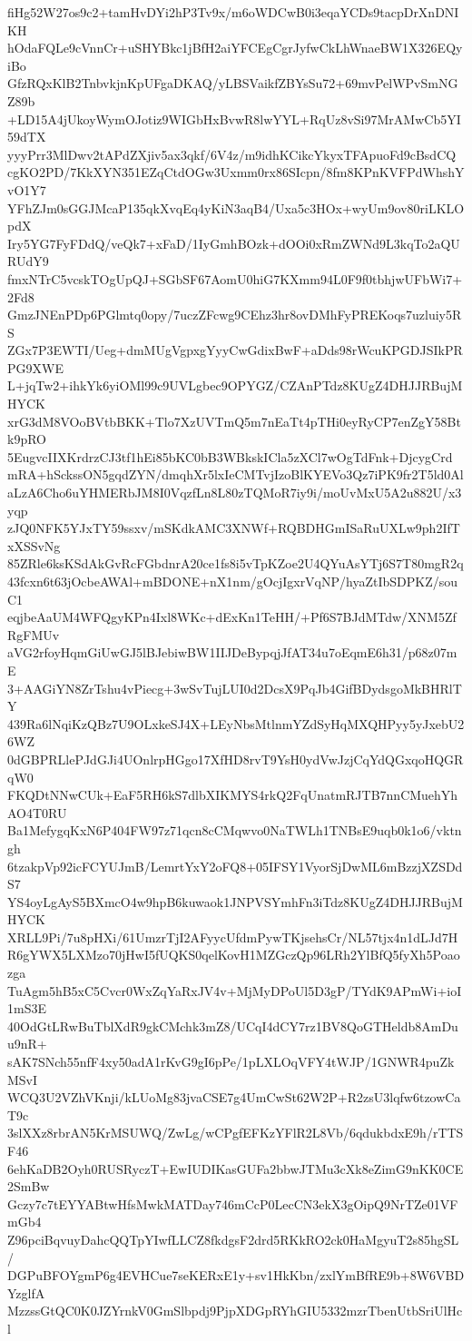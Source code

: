 fiHg52W27os9c2+tamHvDYi2hP3Tv9x/m6oWDCwB0i3eqaYCDs9tacpDrXnDNIKH
hOdaFQLe9cVnnCr+uSHYBkc1jBfH2aiYFCEgCgrJyfwCkLhWnaeBW1X326EQyiBo
GfzRQxKlB2TnbvkjnKpUFgaDKAQ/yLBSVaikfZBYsSu72+69mvPelWPvSmNGZ89b
+LD15A4jUkoyWymOJotiz9WIGbHxBvwR8lwYYL+RqUz8vSi97MrAMwCb5YI59dTX
yyyPrr3MlDwv2tAPdZXjiv5ax3qkf/6V4z/m9idhKCikcYkyxTFApuoFd9cBsdCQ
cgKO2PD/7KkXYN351EZqCtdOGw3Uxmm0rx86SIcpn/8fm8KPnKVFPdWhshYvO1Y7
YFhZJm0sGGJMcaP135qkXvqEq4yKiN3aqB4/Uxa5c3HOx+wyUm9ov80riLKLOpdX
Iry5YG7FyFDdQ/veQk7+xFaD/1IyGmhBOzk+dOOi0xRmZWNd9L3kqTo2aQURUdY9
fmxNTrC5vcskTOgUpQJ+SGbSF67AomU0hiG7KXmm94L0F9f0tbhjwUFbWi7+2Fd8
GmzJNEnPDp6PGlmtq0opy/7uczZFcwg9CEhz3hr8ovDMhFyPREKoqs7uzluiy5RS
ZGx7P3EWTI/Ueg+dmMUgVgpxgYyyCwGdixBwF+aDds98rWcuKPGDJSIkPRPG9XWE
L+jqTw2+ihkYk6yiOMl99c9UVLgbec9OPYGZ/CZAnPTdz8KUgZ4DHJJRBujMHYCK
xrG3dM8VOoBVtbBKK+Tlo7XzUVTmQ5m7nEaTt4pTHi0eyRyCP7enZgY58Btk9pRO
5EugvcIIXKrdrzCJ3tf1hEi85bKC0bB3WBkskICla5zXCl7wOgTdFnk+DjcygCrd
mRA+hSckssON5gqdZYN/dmqhXr5lxIeCMTvjIzoBlKYEVo3Qz7iPK9fr2T5ld0Al
aLzA6Cho6uYHMERbJM8I0VqzfLn8L80zTQMoR7iy9i/moUvMxU5A2u882U/x3yqp
zJQ0NFK5YJxTY59ssxv/mSKdkAMC3XNWf+RQBDHGmISaRuUXLw9ph2IfTxXSSvNg
85ZRle6ksKSdAkGvRcFGbdnrA20ce1fs8i5vTpKZoe2U4QYuAsYTj6S7T80mgR2q
43fcxn6t63jOcbeAWAl+mBDONE+nX1nm/gOcjIgxrVqNP/hyaZtIbSDPKZ/souC1
eqjbeAaUM4WFQgyKPn4Ixl8WKc+dExKn1TeHH/+Pf6S7BJdMTdw/XNM5ZfRgFMUv
aVG2rfoyHqmGiUwGJ5lBJebiwBW1IIJDeBypqjJfAT34u7oEqmE6h31/p68z07mE
3+AAGiYN8ZrTshu4vPiecg+3wSvTujLUI0d2DcsX9PqJb4GifBDydsgoMkBHRlTY
439Ra6lNqiKzQBz7U9OLxkeSJ4X+LEyNbsMtlnmYZdSyHqMXQHPyy5yJxebU26WZ
0dGBPRLlePJdGJi4UOnlrpHGgo17XfHD8rvT9YsH0ydVwJzjCqYdQGxqoHQGRqW0
FKQDtNNwCUk+EaF5RH6kS7dlbXIKMYS4rkQ2FqUnatmRJTB7nnCMuehYhAO4T0RU
Ba1MefygqKxN6P404FW97z71qcn8cCMqwvo0NaTWLh1TNBsE9uqb0k1o6/vktngh
6tzakpVp92icFCYUJmB/LemrtYxY2oFQ8+05IFSY1VyorSjDwML6mBzzjXZSDdS7
YS4oyLgAyS5BXmcO4w9hpB6kuwaok1JNPVSYmhFn3iTdz8KUgZ4DHJJRBujMHYCK
XRLL9Pi/7u8pHXi/61UmzrTjI2AFyycUfdmPywTKjsehsCr/NL57tjx4n1dLJd7H
R6gYWX5LXMzo70jHwI5fUQKS0qelKovH1MZGczQp96LRh2YlBfQ5fyXh5Poaozga
TuAgm5hB5xC5Cvcr0WxZqYaRxJV4v+MjMyDPoUl5D3gP/TYdK9APmWi+ioI1mS3E
40OdGtLRwBuTblXdR9gkCMchk3mZ8/UCqI4dCY7rz1BV8QoGTHeldb8AmDuu9nR+
sAK7SNch55nfF4xy50adA1rKvG9gI6pPe/1pLXLOqVFY4tWJP/1GNWR4puZkMSvI
WCQ3U2VZhVKnji/kLUoMg83jvaCSE7g4UmCwSt62W2P+R2zsU3lqfw6tzowCaT9c
3slXXz8rbrAN5KrMSUWQ/ZwLg/wCPgfEFKzYFlR2L8Vb/6qdukbdxE9h/rTTSF46
6ehKaDB2Oyh0RUSRyczT+EwIUDIKasGUFa2bbwJTMu3cXk8eZimG9nKK0CE2SmBw
Gczy7c7tEYYABtwHfsMwkMATDay746mCcP0LecCN3ekX3gOipQ9NrTZe01VFmGb4
Z96pciBqvuyDahcQQTpYIwfLLCZ8fkdgsF2drd5RKkRO2ck0HaMgyuT2s85hgSL/
DGPuBFOYgmP6g4EVHCue7seKERxE1y+sv1HkKbn/zxlYmBfRE9b+8W6VBDYzglfA
MzzssGtQC0K0JZYrnkV0GmSlbpdj9PjpXDGpRYhGIU5332mzrTbenUtbSriUlHcl
